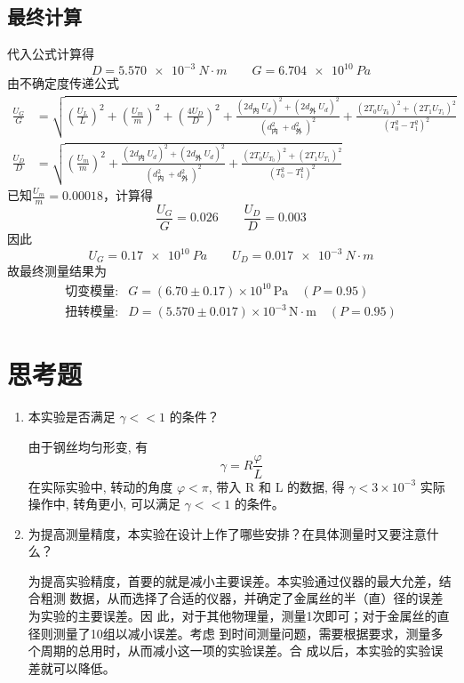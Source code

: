 \documentclass{article}
\begin{document}
\subsection*{最终计算}
代入公式计算得
\[D=\SI{5.570e-3}{N\cdot m}\qquad G=\SI{6.704e10}{Pa}\]
由不确定度传递公式
\[
\begin{aligned}
    \frac{U_G}{G} & =\sqrt{\left(\frac{U_L}{L}\right)^2+\left(\frac{U_m}{m}\right)^2+\left(\frac{4 U_D}{D}\right)^2+\frac{\left(2 d_{\text {内 }} U_{d}\right)^2+\left(2 d_{\text {外 }} U_{d}\right)^2}{\left(d_{\text {内 }}^2+d_{\text {外 }}^2\right)^2}+\frac{\left(2 T_0 U_{T_0}\right)^2+\left(2 T_1 U_{T_1}\right)^2}{\left(T_0^2-T_1^2\right)^2}} \\
    \frac{U_D}{D} & =\sqrt{\left(\frac{U_m}{m}\right)^2+\frac{\left(2 d_{\text {内 }} U_{d}\right)^2+\left(2 d_{\text {外 }} U_{d}\right)^2}{\left(d_{\text {内 }}^2+d_{\text {外 }}^2\right)^2}+\frac{\left(2 T_0 U_{T_0}\right)^2+\left(2 T_1 U_{T_1}\right)^2}{\left(T_0^2-T_1^2\right)^2}}
    \end{aligned}\]
已知$\frac{U_m}{m}=0.00018$，计算得
\[\frac{U_G}{G}=0.026 \qquad\frac{U_D}{D}=0.003\]
因此\[U_G=\SI{0.17e10}{Pa}\qquad U_D=\SI{0.017e-3}{N\cdot m}\]
故最终测量结果为\begin{align*}
    \text{切变模量:}& G=(6.70 \pm 0.17) \times 10^{10} \,\mathrm{P a}\quad(P=0.95)\\
\text{扭转模量:}& D=(5.570 \pm 0.017) \times 10^{-3}\, \mathrm{N} \cdot \mathrm{m}\quad(P=0.95)
\end{align*}

\section*{思考题}
\begin{enumerate}
    \item 本实验是否满足 $\gamma<<1$ 的条件？
    
    由于钢丝均匀形变, 有
$$
\gamma=R \frac{\varphi}{L}
$$
在实际实验中, 转动的角度 $\varphi<\pi$, 带入 $\mathrm{R}$ 和 $\mathrm{L}$ 的数据, 得 $\gamma<3 \times 10^{-3}$ 实际操作中, 转角更小, 可以满足 $\gamma<<1$ 的条件。

    \item 为提高测量精度，本实验在设计上作了哪些安排？在具体测量时又要注意什么？
    
    为提高实验精度，首要的就是减小主要误差。本实验通过仪器的最大允差，结合粗测
数据，从而选择了合适的仪器，并确定了金属丝的半（直）径的误差为实验的主要误差。因
此，对于其他物理量，测量1次即可；对于金属丝的直径则测量了10组以减小误差。考虑
到时间测量问题，需要根据要求，测量多个周期的总用时，从而减小这一项的实验误差。合
成以后，本实验的实验误差就可以降低。
\end{enumerate}
\end{document}
